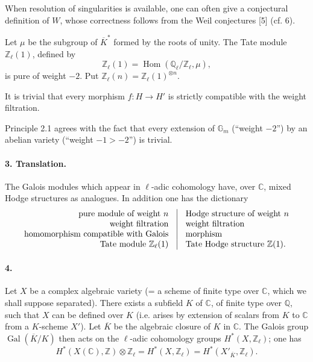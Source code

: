 \documentclass[10pt]{article}
\newcommand{\C}{\mathbb C}
\newcommand{\Q}{\mathbb Q}
\newcommand{\Z}{\mathbb Z}
\newcommand{\Ql}{\mathbb Q_\ell}
\newcommand{\Zl}{\mathbb Z_\ell}
\newcommand{\Gm}{\mathbb G_m}
\newcommand{\Gal}{\operatorname{Gal}}
\newcommand{\Hom}{\operatorname{Hom}}
\newcommand{\barK}{\overline{K}}
\begin{document}
When resolution of singularities is available, one can often give a conjectural definition of $W$, whose correctness follows from the Weil conjectures [5] (cf. 6).

Let $\mu$ be the subgroup of $\barK^*$ formed by the roots of unity. The Tate module $\Zl(1)$, defined by
\[
\Zl(1)=\Hom(\Ql/\Zl,\mu),
\]
is pure of weight $-2$. Put $\Zl(n)=\Zl(1)^{\otimes n}$.

It is trivial that every morphism $f:H\to H'$ is strictly compatible with the weight filtration.

Principle 2.1 agrees with the fact that every extension of $\Gm$ (``weight $-2$'') by an abelian variety (``weight $-1>-2$'') is trivial.

\paragraph{3. Translation.} The Galois modules which appear in $\ell$-adic cohomology have, over $\C$, mixed Hodge structures as analogues. In addition one has the dictionary
\[
\begin{array}{r@{\quad\vrule\quad}l}
\text{pure module of weight }n & \text{Hodge structure of weight }n\\
\text{weight filtration} & \text{weight filtration}\\
\text{homomorphism compatible with Galois} & \text{morphism}\\
\text{Tate module }\Zl(1) & \text{Tate Hodge structure }\Z(1).
\end{array}
\]

\paragraph{4.} Let $X$ be a complex algebraic variety (= a scheme of finite type over $\C$, which we shall suppose separated). There exists a subfield $K$ of $\C$, of finite type over $\Q$, such that $X$ can be defined over $K$ (i.e. arises by extension of scalars from $K$ to $\C$ from a $K$-scheme $X'$). Let $\barK$ be the algebraic closure of $K$ in $\C$. The Galois group $\Gal(\barK/K)$ then acts on the $\ell$-adic cohomology groups $H^*(X,\Zl)$; one has
\[
H^*(X(\C),\Z)\otimes\Zl=H^*(X,\Zl)=H^*(X'_{\barK},\Zl).
\]
\end{document}
